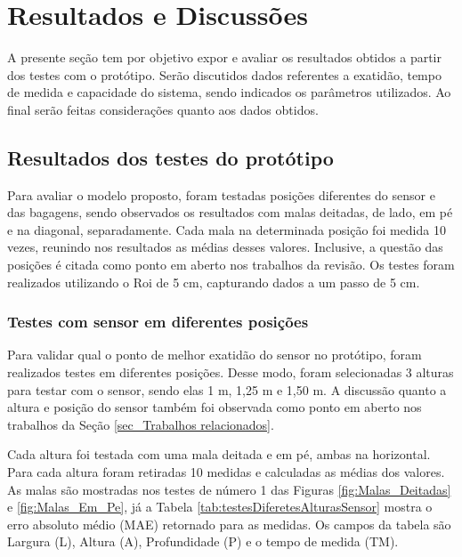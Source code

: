 %
\chapter[Resultados e Discussões]{Resultados e Discussões}
\label{cap_Resultados e Discussoes}

    A presente seção tem por objetivo expor e avaliar os resultados obtidos a partir dos testes com o protótipo. Serão discutidos dados referentes a exatidão, tempo de medida e capacidade do sistema, sendo indicados os parâmetros utilizados. Ao final serão feitas considerações quanto aos dados obtidos.


\section{Resultados dos testes do protótipo}
\label{sec_Resultados dos testes do prototipo}

    Para avaliar o modelo proposto, foram testadas posições diferentes do sensor e das bagagens, sendo observados os resultados com malas deitadas, de lado, em pé e na diagonal, separadamente. Cada mala na determinada posição foi medida 10 vezes, reunindo nos resultados as médias desses valores. Inclusive, a questão das posições é citada como ponto em aberto nos trabalhos da revisão. Os testes foram realizados utilizando o Roi de 5 cm, capturando dados a um passo de 5 cm.

\subsection{Testes com sensor em diferentes posições}
\label{sec_Testes com sensor em diferentes posições}


    Para validar qual o ponto de melhor exatidão do sensor no protótipo, foram realizados testes em diferentes posições. Desse modo, foram selecionadas 3 alturas para testar com o sensor, sendo elas 1 m, 1,25 m e 1,50 m. A discussão quanto a altura e posição do sensor também foi observada como ponto em aberto nos trabalhos da Seção \ref{sec_Trabalhos relacionados}.
    
    Cada altura foi testada com uma mala deitada e em pé, ambas na horizontal. Para cada altura foram retiradas 10 medidas e calculadas as médias dos valores. As malas são mostradas nos testes de número 1 das Figuras \ref{fig:Malas_Deitadas} e \ref{fig:Malas_Em_Pe}, já a Tabela \ref{tab:testesDiferetesAlturasSensor} mostra o erro absoluto médio (MAE) retornado para as medidas. Os campos da tabela são Largura (L), Altura (A), Profundidade (P) e o tempo de medida (TM).


